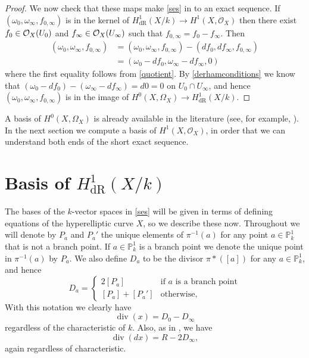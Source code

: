 \documentclass[draft, 11pt]{article} %
\theoremstyle{plain}
\theoremstyle{remark}
\newcommand{\cO}{{\cal O}}
\newcommand{\ra}{\rightarrow}
\newcommand{\hzero}{{H^0(X,\Omega_X)}}
\newcommand{\hone}{H^1(X,\mathcal{O}_X)}
\newcommand{\derhamhone}{H_{\text {dR}}^1(X/k)}
\DeclareMathOperator{\di}{div}
\begin{document}
\begin{proof}
We now check that these maps make \eqref{ses} in to an exact sequence.
If $(\omega_0, \omega_\infty, f_{0,\infty})$ is in the kernel of $\derhamhone \ra \hone$ then there exist $f_0 \in \cO_X(U_0)$ and $f_\infty \in \cO_X(U_\infty)$ such that $f_{0,\infty} = f_0 - f_\infty$.
Then 
\begin{align*}
(\omega_0 , \omega_\infty, f_{0, \infty}) & =  (\omega_0 , \omega_\infty, f_{0, \infty}) - (df_0, df_\infty, f_{0, \infty}) \\
& = (\omega_0 - df_0, \omega_\infty - df_\infty, 0)
\end{align*}
where the first equality follows from \eqref{quotient}.
By \eqref{derhamconditions} we know that $(\omega_0 - df_0)  - (\omega_\infty - df_\infty) = d0 = 0$ on $U_0 \cap U_\infty$,  and hence $(\omega_0, \omega_\infty, f_{0, \infty})$ is in the image of $\hzero \ra \derhamhone$.
\end{proof}

A basis of $H^0(X,\Omega_X)$ is already available in the literature (see, for example, \cite[Prop. 7.4.26]{liu}).
In the next section we compute a basis of $\hone$, in order that we can understand both ends of the short exact sequence.

\section{Basis of $\derhamhone$}

The bases of the $k$-vector spaces in \eqref{ses} will be given in terms of defining equations of the hyperelliptic curve $X$, so we describe these now.
Throughout we will denote by $P_a$ and $P_a'$ the unique elements of $\pi^{-1}(a)$ for any point $a \in \mathbb P_k^1$ that is not a branch point.
If $a \in \mathbb P_k^1$ is a branch point we denote the unique point in $\pi^{-1}(a)$ by $P_a$.
We also define $D_a$ to be the divisor $\pi*([a])$ for any $a \in \mathbb P_k^1$, and hence
\begin{equation}\label{divisorofpoints}
D_a= 
\begin{cases}
 2[P_a] & \text{if $a$ is a branch point} \\
 [P_a] + [P_a'] & \text{otherwise,}
\end{cases}
\end{equation}
With this notation we clearly have
\begin{equation}\label{divxp=2}
\di (x)  = D_0 - D_\infty
\end{equation}
regardless of the characteristic of $k$.
Also, as in \cite[\S 6]{faithfulaction}, we have
\begin{equation}\label{differentialdivisor}
\di(dx) = R - 2D_\infty,
\end{equation}
again regardless of characteristic.
\end{document}
